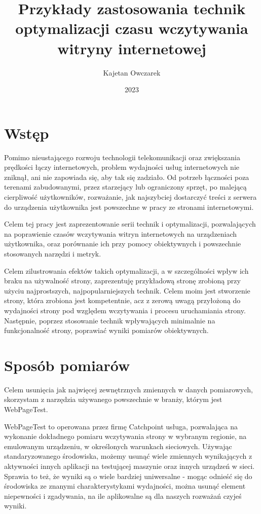 \documentclass[licencjacka]{pracadypl}
\author{Kajetan Owczarek}
\title{Przykłady zastosowania technik optymalizacji czasu wczytywania witryny internetowej}
\date{2023}
\begin{document}
\maketitle
\tableofcontents
\newpage



\chapter{Wstęp}

Pomimo nieustającego rozwoju technologii telekomunikacji oraz zwiększania prędkości łączy internetowych, problem wydajności usług internetowych nie zniknął, ani nie zapowiada się, aby tak się zadziało. Od potrzeb łączności poza terenami zabudowanymi, przez starzejący lub ograniczony sprzęt, po malejącą cierpliwość użytkowników, rozważanie, jak najszybciej dostarczyć treści z serwera do urządzenia użytkownika jest powszechne w pracy ze stronami internetowymi.

Celem tej pracy jest zaprezentowanie serii technik i optymalizacji, pozwalających na poprawienie czasów wczytywania witryn internetowych na urządzeniach użytkownika, oraz porównanie ich przy pomocy obiektywnych i powszechnie stosowanych narzędzi i metryk.

Celem zilustrowania efektów takich optymalizacji, a w szczególności wpływ ich braku na używalność strony, zaprezentuję przykładową stronę zrobioną przy użyciu najprostszych, najpopularniejszych technik. Celem moim jest stworzenie strony, która zrobiona jest kompetentnie, acz z zerową uwagą przyłożoną do wydajności strony pod względem wczytywania i procesu uruchamiania strony. Następnie, poprzez stosowanie technik wpływających minimalnie na funkcjonalność strony, poprawiać wyniki pomiarów obiektywnych.

\chapter{Sposób pomiarów}
Celem usunięcia jak najwięcej zewnętrznych zmiennych w danych pomiarowych,
skorzystam z narzędzia używanego powszechnie w branży, którym jest WebPageTest.

WebPageTest to operowana przez firmę Catchpoint usługa, pozwalająca na wykonanie dokładnego pomiaru wczytywania strony w wybranym regionie, na emulowanym urządzeniu, w określonych warunkach sieciowych. Używając standaryzowanego środowiska, możemy usunąć wiele zmiennych wynikających z aktywności innych aplikacji na testującej maszynie oraz innych urządzeń w sieci. Sprawia to też, że wyniki są o wiele bardziej uniwersalne - mogąc odnieść się do środowiska ze znanymi charakterystykami wydajności, można usunąć element niepewności i zgadywania, na ile aplikowalne są dla naszych rozważań czyjeś wyniki. 
\end{document}
